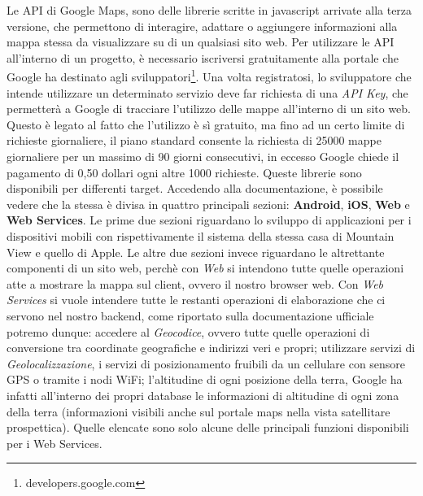 Le API di Google Maps, sono delle librerie scritte in javascript arrivate alla terza versione, che permettono di interagire, adattare o aggiungere informazioni alla mappa stessa da visualizzare su di un qualsiasi sito web. Per utilizzare le API all'interno di un progetto, è necessario iscriversi gratuitamente alla portale che Google ha destinato agli sviluppatori\footnote{developers.google.com}. Una volta registratosi, lo sviluppatore che intende utilizzare un determinato servizio deve far richiesta di una \textit{API Key}, che permetterà a Google di tracciare l'utilizzo delle mappe all'interno di un sito web. Questo è legato al fatto che l'utilizzo è sì gratuito, ma fino ad un certo limite di richieste giornaliere, il piano standard consente la richiesta di 25000 mappe giornaliere per un massimo di 90 giorni consecutivi, in eccesso Google chiede il pagamento di 0,50 dollari ogni altre 1000 richieste. Queste librerie sono disponibili per differenti target. Accedendo alla documentazione\cite{goo:maps}, è possibile vedere che la stessa è divisa in quattro principali sezioni: \textbf{Android}, \textbf{iOS}, \textbf{Web} e \textbf{Web Services}. Le prime due sezioni riguardano lo sviluppo di applicazioni per i dispositivi mobili con rispettivamente il sistema della stessa casa di Mountain View e quello di Apple. Le altre due sezioni invece riguardano le altrettante componenti di un sito web, perchè con \textit{Web} si intendono tutte quelle operazioni atte a mostrare la mappa sul client, ovvero il nostro browser web. Con \textit{Web Services} si vuole intendere tutte le restanti operazioni di elaborazione che ci servono nel nostro backend, come riportato sulla documentazione ufficiale potremo dunque: accedere al \textit{Geocodice}, ovvero tutte quelle operazioni di conversione tra coordinate geografiche e indirizzi veri e propri; utilizzare servizi di \textit{Geolocalizzazione}, i servizi di posizionamento fruibili da un cellulare con sensore GPS o tramite i nodi WiFi; l'altitudine di ogni posizione della terra, Google ha infatti all'interno dei propri database le informazioni di altitudine di ogni zona della terra (informazioni visibili anche sul portale maps nella vista satellitare prospettica). Quelle elencate sono solo alcune delle principali funzioni disponibili per i Web Services.

